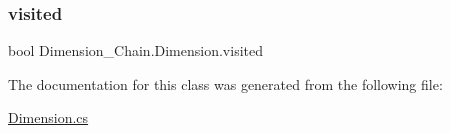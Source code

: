 \subsubsection{\texorpdfstring{visited}{visited}}
{\footnotesize\ttfamily bool Dimension\+\_\+\+Chain.\+Dimension.\+visited}



The documentation for this class was generated from the following file\+:\begin{DoxyCompactItemize}
\item 
\mbox{\hyperlink{_dimension_8cs}{Dimension.\+cs}}\end{DoxyCompactItemize}
